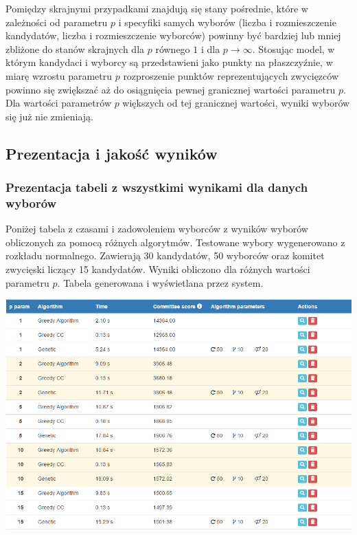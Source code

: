 \documentclass[polish,11pt]{aghthesis}
\begin{document}
Pomiędzy skrajnymi przypadkami znajdują się stany pośrednie, które w zależności od
parametru $p$ i specyfiki samych wyborów (liczba i rozmieszczenie kandydatów, liczba i
rozmieszczenie wyborców) powinny być bardziej lub mniej zbliżone do stanów skrajnych dla
$p$ równego $1$ i dla $p \to \infty$. Stosując model, w którym kandydaci i wyborcy są przedstawieni
jako punkty na płaszczyźnie, w miarę wzrostu parametru $p$ rozproszenie punktów
reprezentujących zwycięzców powinno się zwiększać aż do osiągnięcia pewnej granicznej
wartości parametru $p$. Dla wartości parametrów $p$ większych od tej granicznej wartości, wyniki
wyborów się już nie zmieniają.

\subsection{Prezentacja i jakość wyników}
\subsubsection{Prezentacja tabeli z wszystkimi wynikami dla danych wyborów}
Poniżej tabela z czasami i zadowoleniem wyborców z wyników wyborów obliczonych za
pomocą różnych algorytmów. Testowane wybory wygenerowano z rozkładu normalnego.
Zawierają 30 kandydatów, 50 wyborców oraz komitet zwycięski liczący 15 kandydatów.
Wyniki obliczono dla różnych wartości parametru $p$. Tabela generowana i wyświetlana przez system.

\begin{center}
\centerline{\includegraphics[scale=0.6]{pics/score_table.png}}
\end{center}
\end{document}
